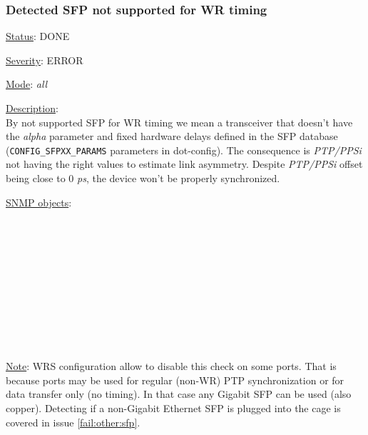 \subsubsection{\bf Detected SFP not supported for WR timing}
		\label{fail:timing:wrong_sfp}
		\begin{pck_descr}
			\item [] \underline{Status}: DONE
			\item [] \underline{Severity}: ERROR
			\item [] \underline{Mode}: \emph{all}
			\item [] \underline{Description}:\\
				By not supported SFP for WR timing we mean a transceiver that doesn't
				have the \emph{alpha} parameter and fixed hardware delays defined in the
				SFP database (\texttt{CONFIG\_SFPXX\_PARAMS} parameters in dot-config). The consequence is
				\emph{PTP/PPSi} not having the right values to estimate link asymmetry.
				Despite \emph{PTP/PPSi} offset being close to 0 \emph{ps}, the device won't
				be properly synchronized.
			\item [] \underline{SNMP objects}:\\
				{\footnotesize
				\\
				\\
				\\
				\\
				\\
				\\
				\\
				\\
				\\
				\\
				 }
			\item [] \underline{Note}: WRS configuration allow to disable this check on some ports.
				That is because ports may be used for regular (non-WR) PTP
				synchronization or for data transfer only (no timing). In that case any
				Gigabit SFP can be used (also copper). Detecting if a non-Gigabit
				Ethernet SFP is plugged into the cage is covered in issue
				\ref{fail:other:sfp}.
		\end{pck_descr}

